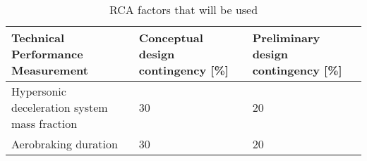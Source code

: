 \begin{table}[h]
	\caption{RCA factors that will be used}
	\label{tab:tpm}
	\begin{tabular}{|p{}|p{}|p{}|}
		\hline
		\textbf{Technical Performance Measurement} & \textbf{Conceptual design contingency [\%]} & \textbf{Preliminary design contingency [\%]} \\ \hline
		Hypersonic deceleration system mass fraction & 30 & 20 \\ \hline
		Aerobraking duration & 30 & 20 \\ \hline
	\end{tabular}
\end{table}